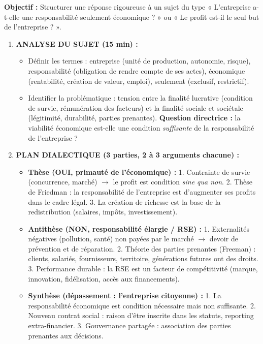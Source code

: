 \documentclass[11pt]{article}
\newcommand{\cle}[1]{{\popxbold\color{popdark}#1}}
\begin{document}
\begin{methode}
    \textbf{Objectif :} Structurer une réponse rigoureuse à un sujet du type « L'entreprise a-t-elle une responsabilité seulement économique ? » ou « Le profit est-il le seul but de l'entreprise ? ».
    \begin{enumerate}
        \item \textbf{ANALYSE DU SUJET (15 min) :}
              \begin{itemize}
                  \item Définir les termes : \cle{entreprise} (unité de production, autonomie, risque), \cle{responsabilité} (obligation de rendre compte de ses actes), \cle{économique} (rentabilité, création de valeur, emploi), \cle{seulement} (exclusif, restrictif).
                  \item Identifier la \cle{problématique} : tension entre la \cle{finalité lucrative} (condition de survie, rémunération des facteurs) et la \cle{finalité sociale et sociétale} (légitimité, durabilité, parties prenantes). \textbf{Question directrice :} la viabilité économique est-elle une condition \emph{suffisante} de la responsabilité de l'entreprise ?
              \end{itemize}
        \item \textbf{PLAN DIALECTIQUE (3 parties, 2 à 3 arguments chacune) :}
              \begin{itemize}
                  \item \textbf{Thèse (OUI, primauté de l'économique) :} 1. Contrainte de survie (concurrence, marché) $\to$ le profit est condition \emph{sine qua non}. 2. Thèse de Friedman : la responsabilité de l'entreprise est d'augmenter ses profits dans le cadre légal. 3. La création de richesse est la base de la redistribution (salaires, impôts, investissement).
                  \item \textbf{Antithèse (NON, responsabilité élargie / RSE) :} 1. Externalités négatives (pollution, santé) non payées par le marché $\to$ devoir de prévention et de réparation. 2. Théorie des parties prenantes (Freeman) : clients, salariés, fournisseurs, territoire, générations futures ont des droits. 3. Performance durable : la RSE est un facteur de compétitivité (marque, innovation, fidélisation, accès aux financements).
                  \item \textbf{Synthèse (dépassement : l'entreprise citoyenne) :} 1. La responsabilité économique est \cle{condition nécessaire mais non suffisante}. 2. Nouveau contrat social : raison d'être inscrite dans les statuts, reporting extra-financier. 3. Gouvernance partagée : association des parties prenantes aux décisions.

\end{itemize}
\end{enumerate}
\end{methode}
\end{document}
